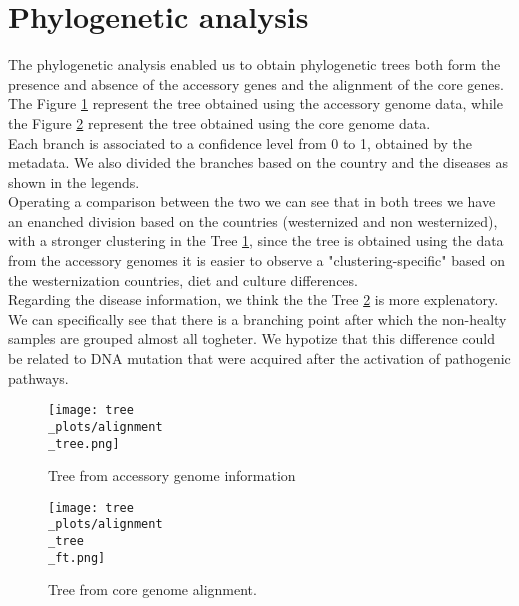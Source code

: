 \documentclass[a4paper,titlepage, oneside]{book}
\begin{document}
\section{Phylogenetic analysis }
The phylogenetic analysis enabled us to obtain phylogenetic trees both form the presence and absence of the accessory genes and the alignment of the core genes.
The Figure \ref{fig:Tree1} represent the tree obtained using the accessory genome data, while the Figure \ref{fig:Tree2} represent the tree obtained using the core genome data.\\Each branch is associated to a confidence level from 0 to 1, obtained by the metadata. We also divided the branches based on the country and the diseases as shown in the legends.
\\Operating a comparison between the two we can see that in both trees we have an enanched division based on the countries (westernized and non westernized), with a stronger clustering in the Tree \ref{fig:Tree1}, since the tree is obtained using the data from the accessory genomes it is easier to observe a "clustering-specific" based on the westernization countries, diet and culture differences.
\\Regarding the disease information, we think the the Tree \ref{fig:Tree2} is more explenatory. We can specifically see that there is a branching point after which the non-healty samples are grouped almost all togheter. We hypotize that this difference could be related to DNA mutation that were acquired after the activation of pathogenic pathways.

\begin{figure}[ht]
\centering
\texttt{[image: tree\\\_plots/alignment\\\_tree.png]}
\caption{Tree from accessory genome information}
\label{fig:Tree1}
\end{figure}


\begin{figure}[ht]
\centering
\texttt{[image: tree\\\_plots/alignment\\\_tree\\\_ft.png]}
\caption{Tree from core genome alignment.}
\label{fig:Tree2}
\end{figure}
\end{document}
